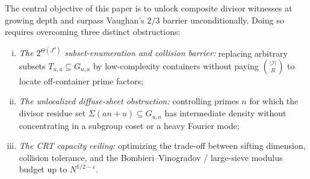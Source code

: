 \documentclass[11pt, a4paper]{article}
\theoremstyle{plain}
\theoremstyle{definition}
\begin{document}
The central objective of this paper is to unlock composite divisor witnesses at growing depth and surpass Vaughan's $2/3$ barrier unconditionally. Doing so requires overcoming three distinct obstructions:
\begin{enumerate}[(i)]
    \item \emph{The $2^{\Theta(J^{4})}$ subset-enumeration and collision barrier:} replacing arbitrary subsets $T_{u,a}\subseteq G_{u,a}$ by low-complexity containers without paying $\binom{|\mathcal{I}|}{R}$ to locate off-container prime factors;
    \item \emph{The unlocalized diffuse-sheet obstruction:} controlling primes $n$ for which the divisor residue set $\Sigma(an+u)\subseteq G_{u,a}$ has intermediate density without concentrating in a subgroup coset or a heavy Fourier mode;
    \item \emph{The CRT capacity ceiling:} optimizing the trade-off between sifting dimension, collision tolerance, and the Bombieri--Vinogradov / large-sieve modulus budget up to $N^{1/2-\varepsilon}$.
\end{enumerate}
\end{document}
